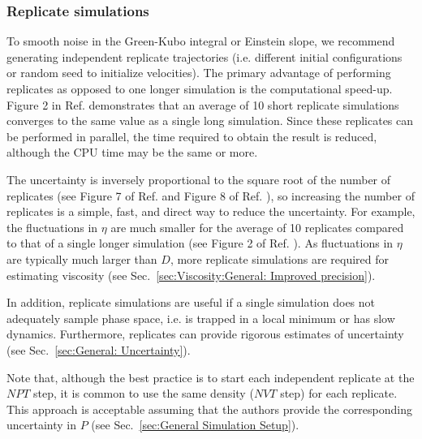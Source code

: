 \documentclass[9pt,bestpractices]{livecoms}
\begin{document}
\subsubsection{Replicate simulations} \label{sec:General: Replicate simulations}

To smooth noise in the Green-Kubo integral or Einstein slope, we recommend generating independent replicate trajectories (i.e. different initial configurations or random seed to initialize velocities). The primary advantage of performing replicates as opposed to one longer simulation is the computational speed-up. Figure 2 in Ref. \cite{Payal2012} demonstrates that an average of 10 short replicate simulations converges to the same value as a single long simulation. Since these replicates can be performed in parallel, the time required to obtain the result is reduced, although the CPU time may be the same or more.


The uncertainty is inversely proportional to the square root of the number of replicates (see Figure 7 of Ref. \cite{Zhang2015} and Figure 8 of Ref. \cite{Ma2017}), so increasing the number of replicates is a simple, fast, and direct way to reduce the uncertainty. For example, the fluctuations in $\eta$ are much smaller for the average of 10 replicates compared to that of a single longer simulation (see Figure 2 of Ref. \cite{Payal2012}). As fluctuations in $\eta$ are typically much larger than $D$, more replicate simulations are required for estimating viscosity (see Sec.\ \ref{sec:Viscosity:General: Improved precision}).

In addition, replicate simulations are useful if a single simulation does not adequately sample phase space, i.e. is trapped in a local minimum or has slow dynamics. Furthermore, replicates can provide rigorous estimates of uncertainty (see Sec.\ \ref{sec:General: Uncertainty}).

Note that, although the best practice is to start each independent replicate at the $NPT$ step, it is common to use the same density ($NVT$ step) for each replicate. This approach is acceptable assuming that the authors provide the corresponding uncertainty in $P$ (see Sec.\ \ref{sec:General Simulation Setup}).
\end{document}
